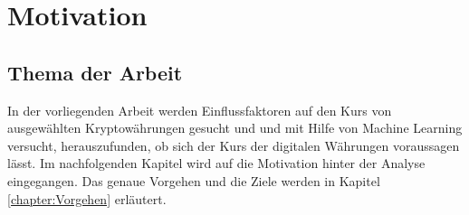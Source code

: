 \chapter{Motivation}\label{chap:motivation}

\section{Thema der Arbeit}\label{sec:thema}
In der vorliegenden Arbeit werden Einflussfaktoren auf den Kurs von ausgewählten Kryptowährungen gesucht und und mit Hilfe von Machine Learning versucht, herauszufunden, ob sich der Kurs der digitalen Währungen voraussagen lässt. Im nachfolgenden Kapitel wird auf die Motivation hinter der Analyse eingegangen. Das genaue Vorgehen und die Ziele werden in Kapitel \ref{chapter:Vorgehen} erläutert.

